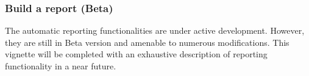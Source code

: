 \documentclass[12pt]{article}
\begin{document}
\subsubsection{Build a report (Beta)}\label{sec:Report}

The automatic reporting functionalities are under active development. However, they are still in Beta version and amenable to numerous modifications.
This vignette will be completed with an exhaustive description of  reporting functionality in a near future.


%
%
%
%
%
%
%
%
%
\end{document}
